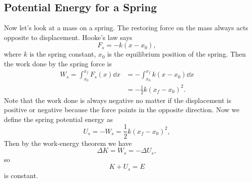 \documentclass[../classical_mechanics.tex]{subfiles}
\begin{document}
        \subsection{Potential Energy for a Spring}\label{subsec:potential-energy-for-a-spring}
            Now let's look at a mass on a spring. The restoring force on the mass always acts opposite to displacement. Hooke's law says
            \begin{equation}
                F_s=-k(x-x_0),
            \end{equation}
            where $k$ is the spring constant, $x_0$ is the equilibrium position of the spring.
            Then the work done by the spring force is
            \begin{align}
                W_s=\int_{x_0}^{x_f}F_s(x)\dd{x}&=-\int_{x_0}^{x_f}k(x-x_0)\dd{x}\\
                &=-\frac{1}{2}k(x_f-x_0)^2.
            \end{align}
            Note that the work done is always negative no matter if the displacement is positive or negative because the force points in the opposite direction.
            Now we define the spring potential energy as
            \begin{equation}
                U_s=-W_s=\frac{1}{2}k(x_f-x_0)^2,
            \end{equation}
            Then by the work-energy theorem we have
            \begin{equation}
                \Delta K=W_s=-\Delta U_s,
            \end{equation}
            so
            \begin{equation}
                K+U_s=E
            \end{equation}
            is constant.

\end{document}
